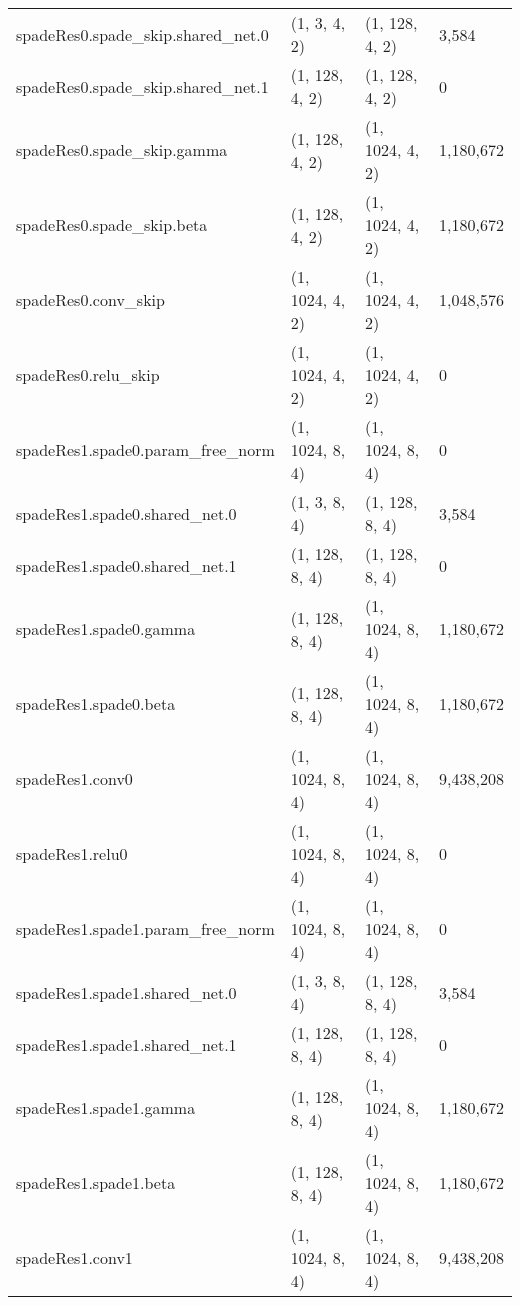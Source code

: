 \begin{longtable}{llll}
        spadeRes0.spade\_skip.shared\_net.0 &        (1, 3, 4, 2) &      (1, 128, 4, 2) &        3,584 \\
        spadeRes0.spade\_skip.shared\_net.1 &      (1, 128, 4, 2) &      (1, 128, 4, 2) &            0 \\
            spadeRes0.spade\_skip.gamma &      (1, 128, 4, 2) &     (1, 1024, 4, 2) &    1,180,672 \\
                spadeRes0.spade\_skip.beta &      (1, 128, 4, 2) &     (1, 1024, 4, 2) &    1,180,672 \\
                    spadeRes0.conv\_skip &     (1, 1024, 4, 2) &     (1, 1024, 4, 2) &    1,048,576 \\
                    spadeRes0.relu\_skip &     (1, 1024, 4, 2) &     (1, 1024, 4, 2) &            0 \\
        spadeRes1.spade0.param\_free\_norm &     (1, 1024, 8, 4) &     (1, 1024, 8, 4) &            0 \\
            spadeRes1.spade0.shared\_net.0 &        (1, 3, 8, 4) &      (1, 128, 8, 4) &        3,584 \\
            spadeRes1.spade0.shared\_net.1 &      (1, 128, 8, 4) &      (1, 128, 8, 4) &            0 \\
                spadeRes1.spade0.gamma &      (1, 128, 8, 4) &     (1, 1024, 8, 4) &    1,180,672 \\
                    spadeRes1.spade0.beta &      (1, 128, 8, 4) &     (1, 1024, 8, 4) &    1,180,672 \\
                        spadeRes1.conv0 &     (1, 1024, 8, 4) &     (1, 1024, 8, 4) &    9,438,208 \\
                        spadeRes1.relu0 &     (1, 1024, 8, 4) &     (1, 1024, 8, 4) &            0 \\
        spadeRes1.spade1.param\_free\_norm &     (1, 1024, 8, 4) &     (1, 1024, 8, 4) &            0 \\
            spadeRes1.spade1.shared\_net.0 &        (1, 3, 8, 4) &      (1, 128, 8, 4) &        3,584 \\
            spadeRes1.spade1.shared\_net.1 &      (1, 128, 8, 4) &      (1, 128, 8, 4) &            0 \\
                spadeRes1.spade1.gamma &      (1, 128, 8, 4) &     (1, 1024, 8, 4) &    1,180,672 \\
                    spadeRes1.spade1.beta &      (1, 128, 8, 4) &     (1, 1024, 8, 4) &    1,180,672 \\
                        spadeRes1.conv1 &     (1, 1024, 8, 4) &     (1, 1024, 8, 4) &    9,438,208 \\

\end{longtable}
